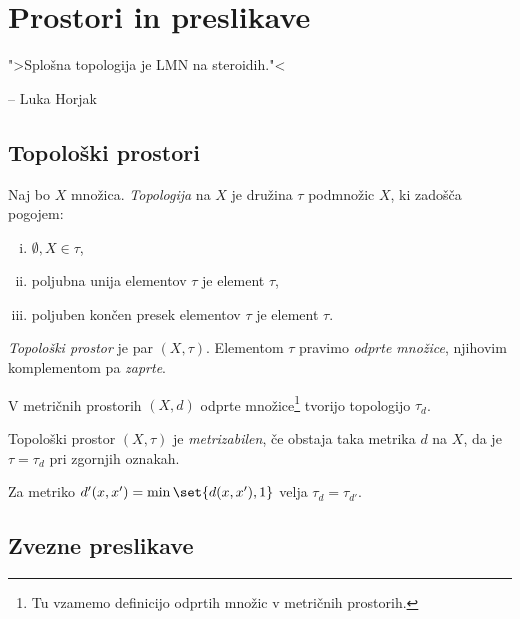 \section{Prostori in preslikave}

\epigraph{">Splošna topologija je LMN na steroidih."<}{-- Luka Horjak}

\subsection{Topološki prostori}


\begin{okvir}
\begin{definicija}
Naj bo $X$ množica. \emph{Topologija} na $X$ je
družina $\tau$ podmnožic $X$, ki zadošča pogojem:

\begin{enumerate}[i)]
\item $\emptyset, X \in \tau$,
\item poljubna unija elementov $\tau$ je element
$\tau$,
\item poljuben končen presek elementov $\tau$ je element
$\tau$.
\end{enumerate}

\emph{Topološki prostor} je par
$(X,\tau)$. Elementom $\tau$ pravimo
\emph{odprte množice},
njihovim komplementom pa \emph{zaprte}.
\end{definicija}
\end{okvir}

\begin{opomba}
V metričnih prostorih $(X,d)$ odprte množice\footnote{Tu vzamemo
definicijo odprtih množic v metričnih prostorih.} tvorijo
topologijo $\tau_d$.
\end{opomba}

\begin{definicija}
Topološki prostor $(X,\tau)$ je
\emph{metrizabilen}, če
obstaja taka metrika $d$ na $X$, da je
$\tau = \tau_d$ pri zgornjih oznakah.
\end{definicija}

\begin{opomba}
Za metriko $d'(x,x') = \min \set{d(x,x'),1}$ velja
$\tau_d = \tau_{d'}$.
\end{opomba}

\newpage

\subsection{Zvezne preslikave}

